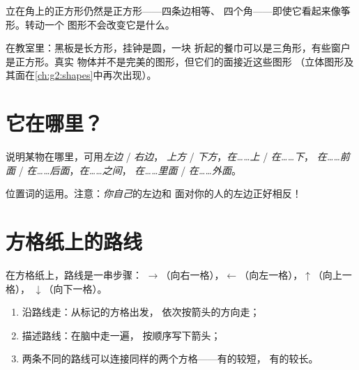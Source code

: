 \begin{example}[倾斜的图形仍是图形]\label{ex:g1:shapes:tilted}
立在角上的正方形仍然是正方形——四条边相等、
四个角——即使它看起来像筝形。转动一个
图形不会改变它是什么。
\end{example}

\begin{example}[找图形]\label{ex:g1:shapes:hunt}
在教室里：黑板是长方形，挂钟是圆，一块
折起的餐巾可以是三角形，有些窗户是正方形。真实
物体并不是完美的图形，但它们的面接近这些图形
（立体图形及其面在\cref{ch:g2:shapes}中再次出现）。
\end{example}

\section{它在哪里？}

\begin{definition}[位置词]\label{def:g1:shapes:position}
说明某物在哪里，可用\emph{左边} / \emph{右边}，
\emph{上方} / \emph{下方}，\emph{在……上} / \emph{在……下}，
\emph{在……前面} / \emph{在……后面}，\emph{在……之间}，
\emph{在……里面} / \emph{在……外面}。
\end{definition}

\begin{omfigure}

{\small 位置词的运用。注意：\emph{你自己}的左边和
面对你的人的左边正好相反！}
\end{omfigure}

\section{方格纸上的路线}

\begin{method}[描述路线]\label{met:g1:shapes:path}
在方格纸上，路线是一串步骤：
$\to$（向右一格），$\leftarrow$（向左一格），$\uparrow$（向上一格），
$\downarrow$（向下一格）。
\begin{enumerate}
  \item 沿路线走：从标记的方格出发，
        依次按箭头的方向走；
  \item 描述路线：在脑中走一遍，
        按顺序写下箭头；
  \item 两条不同的路线可以连接同样的两个方格——有的较短，
        有的较长。
\end{enumerate}
\end{method}

